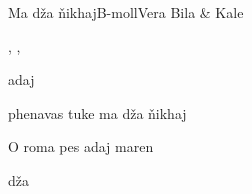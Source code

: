 \documentclass[a4paper,draft]{book}
\begin{document}
\begin{otherlanguage}{czech}
\begin{song}{Ma dža ňikhaj}{B-moll}{}{Vera Bila \& Kale}{}{}
\begin{SBVerse}

   

, ,  

\end{SBVerse}
\begin{SBChorus}

  adaj  

phenavas tuke ma dža ňikhaj

O roma pes adaj maren

  dža 

\end{SBChorus}

\end{song}


\end{otherlanguage}
\end{document}
